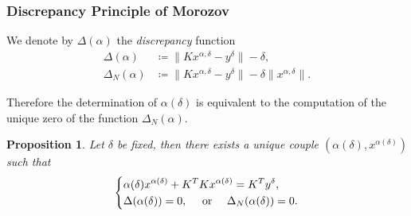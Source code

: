 \documentclass[10pt]{beamer}
\newtheorem{proposition}[subsection]{Proposition}
\theoremstyle{plain}
\theoremstyle{plain}
\begin{document}
\begin{frame}
 \frametitle{Discrepancy Principle of Morozov}
 \begin{definition}
 We denote by $\Delta(\alpha)$ the \emph{discrepancy} function
 \begin{align}
  \Delta(\alpha)&\coloneqq\|Kx^{\alpha,\delta} - y^\delta\| - \delta, \label{eq:def-disc}\\
  \Delta_N(\alpha)&\coloneqq\|Kx^{\alpha,\delta} - y^\delta\| - \delta\|x^{\alpha,\delta}\|.\label{eq:def-disc-N}
 \end{align}
\end{definition}
Therefore the determination of $\alpha(\delta)$ is equivalent to the computation 
of the unique zero of the function $\Delta_N(\alpha)$.
\begin{proposition}
\label{prop:strategy-disc}
 Let $\delta$ be fixed, then there exists a unique 
 couple $(\alpha(\delta), x^{\alpha(\delta)})$ such that
 \begin{equation}
  \left\{
  \begin{split}
   & \alpha(\delta) x^{\alpha(\delta)} + K^TKx^{\alpha(\delta)} = K^Ty^\delta, \\
   & \Delta(\alpha(\delta))=0, \quad\textup{ or }\quad \Delta_N(\alpha(\delta))=0.
  \end{split}
  \right.
 \end{equation}
\end{proposition}
\end{frame}
\end{document}
